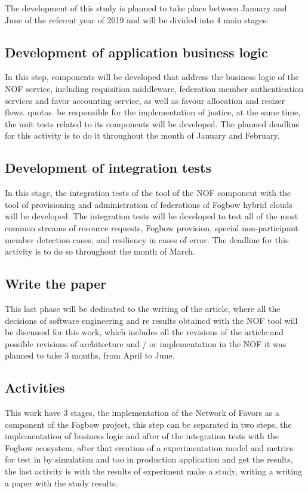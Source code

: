 \documentclass{article}
\begin{document}
The development of this study is planned to take place between January and June of the referent year of 2019 and will be divided into 4 main stages:
\subsection{Development of application business logic}
	In this step, components will be developed that address the business logic of the NOF service, including requisition middleware, federation member authentication services and favor accounting service, as well as favour allocation and resizer flows. quotas. be responsible for the implementation of justice, at the same time, the unit tests related to its components will be developed. The planned deadline for this activity is to do it throughout the month of January and February.
\subsection{Development of integration tests}
    In this stage, the integration tests of the tool of the NOF component with the tool of provisioning and administration of federations of Fogbow hybrid clouds will be developed. The integration tests will be developed to test all of the most common streams of resource requests, Fogbow provision, special non-participant member detection cases, and resiliency in cases of error. The deadline for this activity is to do so throughout the month of March.
\subsection{Write the paper}
    This last phase will be dedicated to the writing of the article, where all the decisions of software engineering and re results obtained with the NOF tool will be discussed for this work, which includes all the revisions of the article and possible revisions of architecture and / or implementation in the NOF it was planned to take 3 months, from April to June.

\subsection{Activities}
This work have 3 stages, the implementation of the Network of Favors as a component of the Fogbow project, this step can be separated in two steps, the implementation of business logic and after of the integration tests with the Fogbow ecosystem, after that creation of a experimentation model and metrics for test in by simulation and too in production application and get the results, the last activity is with the results of experiment make a study, writing a writing a paper with the study results.
\end{document}
